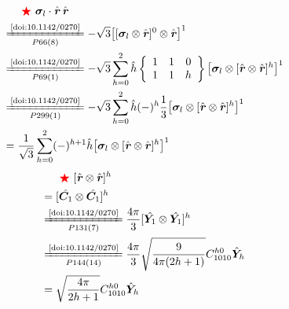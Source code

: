 \documentclass[master]{shnuthesis}
\newcommand{\bmr}{\textbf{\textit{r}}}
\newcommand{\il}{\!\!\!\!\!\!\!\!\!\!}
\newcommand{\zdydh}{\xlongequal}
\newcommand{\redstar}{{\color{red} \bigstar}\,\,}
\begin{document}
\begin{align}
    & \redstar \bm{\sigma}_l\cdot\hat{\bmr}\,\hat{\bmr} \notag\\
    &\il \zdydh[P66(8)]{\text{\cite{doi:10.1142/0270}}} -\sqrt{3} \big[ [\bm{\sigma}_l \otimes \hat{\bmr}]^0 \otimes \hat{\bmr} \big]^1 \\
    &\il \zdydh[P69(1)]{\text{\cite{doi:10.1142/0270}}} -\sqrt{3} \sum_{h=0}^{2}\hat{h}  \left\{\begin{array}{ccc} 1 & 1 & 0 \\ 1 & 1 & h \end{array}\right\}  \big[ \bm{\sigma}_l \otimes [\hat{\bmr} \otimes \hat{\bmr}]^h \big]^1 \\
    &\il \zdydh[P299(1)]{\text{\cite{doi:10.1142/0270}}} -\sqrt{3} \sum_{h=0}^{2}\hat{h}  (-)^{h}\frac{1}{3}  \big[ \bm{\sigma}_l \otimes [\hat{\bmr} \otimes \hat{\bmr}]^h \big]^1 \\
    &\il = \frac{1}{\sqrt{3}} \sum_{h=0}^{2} (-)^{h+1}\hat{h} \big[ \bm{\sigma}_l \otimes [\hat{\bmr} \otimes \hat{\bmr}]^h \big]^1 \label{sigma-l-rr}
\end{align}
\begin{align}
    & \redstar [\hat{\bmr} \otimes \hat{\bmr}]^h \notag\\
    &\il = [\hat{\bm{C}_1} \otimes \hat{\bm{C}_1}]^h \\
    &\il \zdydh[P131(7)]{\text{\cite{doi:10.1142/0270}}} \frac{4\pi}{3}[\hat{\bm{Y}_1} \otimes \hat{\bm{Y}_1}]^h \\
    &\il \zdydh[P144(14)]{\text{\cite{doi:10.1142/0270}}} \frac{4\pi}{3}\sqrt{\frac{9}{4\pi(2h+1)}}C_{1010}^{h0}\hat{\bm{Y}}_h \\
    &\il = \sqrt{\frac{4\pi}{2h+1}}C_{1010}^{h0}\hat{\bm{Y}}_h \label{rr-h}
\end{align}
\end{document}
